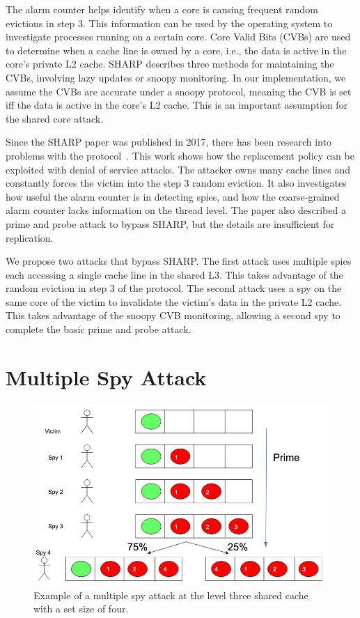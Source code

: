 \documentclass[12pt]{article}
\begin{document}
The alarm counter helps identify when a core is causing frequent random evictions in step $3$.
This information can be used by the operating system to investigate processes running on a certain core.
Core Valid Bits (CVBs) are used to determine when a cache line is owned by a core, i.e., the data is active in the core's private L2 cache.
SHARP describes three methods for maintaining the CVBs, involving lazy updates or snoopy monitoring.
In our implementation, we assume the CVBs are accurate under a snoopy protocol, meaning the CVB is set iff the data is active in the core's L2 cache. 
This is an important assumption for the shared core attack.

Since the SHARP paper was published in 2017, there has been research into problems with the protocol~\cite{howSharp}.
This work shows how the replacement policy can be exploited with denial of service attacks.
The attacker owns many cache lines and constantly forces the victim into the step $3$ random eviction.
It also investigates how useful the alarm counter is in detecting spies, and how the coarse-grained alarm counter lacks information on the thread level.
The paper also described a prime and probe attack to bypass SHARP, but the details are insufficient for replication.

We propose two attacks that bypass SHARP.
The first attack uses multiple spies each accessing a single cache line in the shared L3.
This takes advantage of the random eviction in step $3$ of the protocol.
The second attack uses a spy on the same core of the victim to invalidate the victim's data in the private L2 cache.
This takes advantage of the snoopy CVB monitoring, allowing a second spy to complete the basic prime and probe attack.

\section{Multiple Spy Attack}

\begin{figure}[h]
\centering
\includegraphics[scale=0.9]{../presentation/shared.png}
\caption{Example of a multiple spy attack at the level three shared cache with a set size of four.}
\label{fig:ms}
\end{figure}
\end{document}
